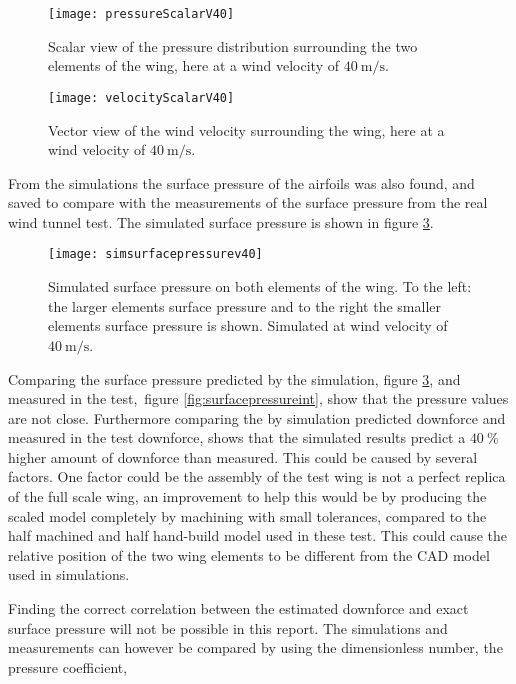   \begin{figure}
    \texttt{[image: pressureScalarV40]}
    \caption{Scalar view of the pressure distribution surrounding the two elements of the wing, here at a wind velocity of $\SI{40}{\metre\per\second}$.}
    \label{fig:pressureScalarV40}
  \end{figure}

  \begin{figure}
    \texttt{[image: velocityScalarV40]}
    \caption{Vector view of the wind velocity surrounding the wing, here at a wind velocity of $\SI{40}{\metre\per\second}$.}
    \label{fig:velocityScalarV40}
  \end{figure}

  From the simulations the surface pressure of the airfoils was also found, and saved to compare with the measurements of the surface pressure from the real wind tunnel test. The simulated surface pressure is shown in figure \ref{fig:simsurfacepressurev40}.

  \begin{figure}
    \texttt{[image: simsurfacepressurev40]}
    \caption{Simulated surface pressure on both elements of the wing. To the left: the larger elements surface pressure and to the right the smaller elements surface pressure is shown. Simulated at wind velocity of $\SI{40}{\metre\per\second}$.}
    \label{fig:simsurfacepressurev40}
  \end{figure}

  Comparing the surface pressure predicted by the simulation, figure \ref{fig:simsurfacepressurev40}, and measured in the test, figure \ref{fig:surfacepressureint}, show that the pressure values are not close. Furthermore comparing the by simulation predicted downforce and measured in the test downforce, shows that the simulated results predict a $\SI{40}{\%}$ higher amount of downforce than measured. This could be caused by several factors. One factor could be the assembly of the test wing is not a perfect replica of the full scale wing, an improvement to help this would be by producing the scaled model completely by machining with small tolerances, compared to the half machined and half hand-build model used in these test. This could cause the relative position of the two wing elements to be different from the CAD model used in simulations.

  Finding the correct correlation between the estimated downforce and exact surface pressure will not be possible in this report. The simulations and measurements can however be compared by using the dimensionless number, the pressure coefficient,

